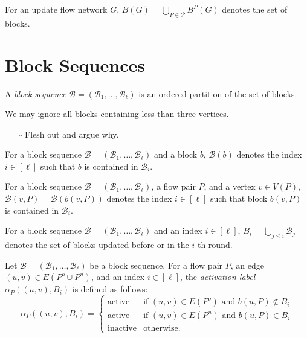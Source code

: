 \documentclass[fontsize=11pt,paper=a4]{book}
\begin{document}
\begin{notation}
For an update flow network \(G\), \(B(G)=\bigcup_{P\in\mathcal{P}}B^P(G)\) denotes the set of blocks.
\label{orgafd4369}
\end{notation}

\chapter{Block Sequences}
\label{sec:orga21b652}

\begin{defn}
A \emph{block sequence} \(\mathcal{B}=(\mathscr{B}_1,\dots,\mathscr{B}_{\ell})\) is an ordered partition of the set of blocks.
\label{org1fe743a}
\end{defn}

\begin{remark}
We may ignore all blocks containing less than three vertices.
\label{orgbe725f4}
\end{remark}

\begin{itemize}
\item[{$\square$}] Flesh out and argue why.
\end{itemize}

\begin{notation}
For a block sequence \(\mathcal{B}=(\mathscr{B}_1,\dots,\mathscr{B}_{\ell})\) and a block \(b\), \(\mathcal{B}(b)\) denotes the index \(i\in[\ell]\) such that \(b\) is contained in \(\mathscr{B}_i\).
\label{org79f7d52}
\end{notation}

\begin{notation}
For a block sequence \(\mathcal{B}=(\mathscr{B}_1,\dots,\mathscr{B}_{\ell})\), a flow pair \(P\), and a vertex \(v\in V(P)\), \(\mathcal{B}(v,P)=\mathcal{B}(b(v,P))\) denotes the index \(i\in[\ell]\) such that block \(b(v,P)\) is contained in \(\mathscr{B}_i\).
\label{org3ce10e5}
\end{notation}

\begin{notation}
For a block sequence \(\mathcal{B}=(\mathscr{B}_1,\dots,\mathscr{B}_{\ell})\) and an index \(i\in[\ell]\), \(B_i=\bigcup_{j\leq i}\mathscr{B}_j\) denotes the set of blocks updated before or in the \(i\)-th round.
\label{org6460974}
\end{notation}

\begin{defn}
Let \(\mathcal{B}=(\mathscr{B}_1,\dots,\mathscr{B}_{\ell})\) be a block sequence.
For a flow pair \(P\), an edge \((u,v)\in E(P^o\cup P^u)\), and an index \(i\in[\ell]\), the \emph{activation label} \(\alpha_P((u,v),B_i)\) is defined as follows:
\[\alpha_P((u,v),B_i)=
\begin{cases}
\mathrm{active} & \text{if }(u,v)\in E(P^o)\text{ and }b(u,P)\notin B_i\\
\mathrm{active} & \text{if }(u,v)\in E(P^u)\text{ and }b(u,P)\in B_i\\
\mathrm{inactive} & \text{otherwise}.
\end{cases}\]
\label{orgccf29bb}
\end{defn}
\end{document}

